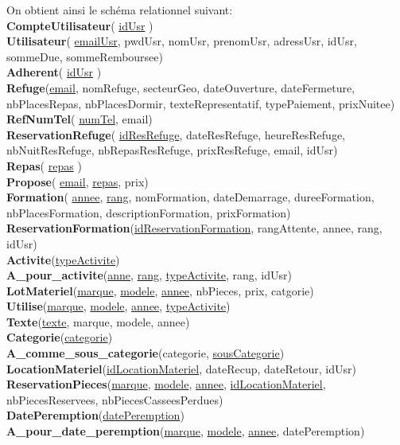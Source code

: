 On obtient ainsi le schéma relationnel suivant:\\
\textbf{CompteUtilisateur}( \underline{idUsr} )\\
\textbf{Utilisateur}( \underline{emailUsr}, pwdUsr, nomUsr, prenomUsr, adressUsr, idUsr, sommeDue, sommeRemboursee)\\
\textbf{Adherent}( \underline{idUsr} )\\
\textbf{Refuge}(\underline{email}, nomRefuge, secteurGeo, dateOuverture, dateFermeture, nbPlacesRepas, nbPlacesDormir, texteRepresentatif, typePaiement, prixNuitee)\\
\textbf{RefNumTel}( \underline{numTel}, email)\\
\textbf{ReservationRefuge}( \underline{idResRefuge}, dateResRefuge, heureResRefuge, nbNuitResRefuge, nbRepasResRefuge, prixResRefuge, email, idUsr)\\
\textbf{Repas}( \underline{repas} )\\
\textbf{Propose}( \underline{email}, \underline{repas}, prix)\\
\textbf{Formation}( \underline{annee}, \underline{rang}, nomFormation, dateDemarrage, dureeFormation, nbPlacesFormation, descriptionFormation, prixFormation)\\
\textbf{ReservationFormation}(\underline{idReservationFormation}, rangAttente, annee, rang, idUsr)\\
\textbf{Activite}(\underline{typeActivite})\\
\textbf{A\_pour\_activite}(\underline{anne}, \underline{rang}, \underline{typeActivite}, rang, idUsr)\\
\textbf{LotMateriel}(\underline{marque}, \underline{modele}, \underline{annee}, nbPieces, prix, catgorie)\\
\textbf{Utilise}(\underline{marque}, \underline{modele}, \underline{annee}, \underline{typeActivite})\\
\textbf{Texte}(\underline{texte}, marque, modele, annee)\\
\textbf{Categorie}(\underline{categorie})\\
\textbf{A\_comme\_sous\_categorie}(categorie, \underline{sousCategorie})\\
\textbf{LocationMateriel}(\underline{idLocationMateriel}, dateRecup, dateRetour, idUsr)\\
\textbf{ReservationPieces}(\underline{marque}, \underline{modele}, \underline{annee}, \underline{idLocationMateriel}, nbPiecesReservees, nbPiecesCasseesPerdues)\\
\textbf{DatePeremption}(\underline{datePeremption})\\
\textbf{A\_pour\_date\_peremption}(\underline{marque}, \underline{modele}, \underline{annee}, datePeremption)\\


